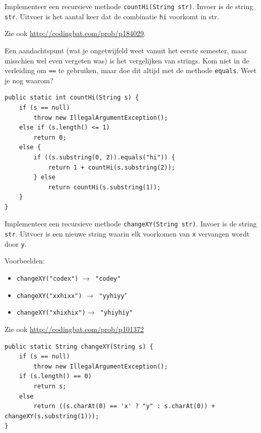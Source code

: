 \begin{oef}
\code Implementeer een recursieve methode \verb/countHi(String str)/. Invoer is de string \verb/str/. Uitvoer is het aantal keer dat de combinatie \verb/hi/ voorkomt in str.

Zie ook \url{http://codingbat.com/prob/p184029}.
\begin{opl}
Een aandachtspunt (wat je ongetwijfeld weet vanuit het eerste semester, maar misschien wel even vergeten was) is het vergelijken van strings. Kom niet in de verleiding om \verb+==+ te gebruiken, maar doe dit altijd met de methode \verb+equals+. Weet je nog waarom?
\begin{lstlisting}[caption={Recursieve methode om het aantal keer te tellen dat de string hi in een string voorkomt}, label=reccounthi]
public static int countHi(String s) {
	if (s == null)
		throw new IllegalArgumentException();
	else if (s.length() <= 1)
		return 0;
	else {
		if ((s.substring(0, 2)).equals("hi")) {
			return 1 + countHi(s.substring(2));
		} else
			return countHi(s.substring(1));
	}
}
\end{lstlisting}
\end{opl}
\end{oef}





\begin{oef}
\code Implementeer een recursieve methode \verb/changeXY(String str)/. Invoer is de string \verb/str/. Uitvoer is een nieuwe string waarin elk voorkomen van \verb/x/ vervangen wordt door \verb/y/.

Voorbeelden:
\begin{itemize}
\item \verb/changeXY("codex")/ $\rightarrow $\verb/ "codey"/
\item \verb/changeXY("xxhixx")/  $\rightarrow $\verb/ "yyhiyy/"
\item \verb/changeXY("xhixhix")/$ \rightarrow $\verb/ "yhiyhiy"/
\end{itemize}
Zie ook \url{http://codingbat.com/prob/p101372}

\begin{opl}
\begin{lstlisting}[caption={Vervang in een string elke letter x door een y}, label=recchangexy]
public static String changeXY(String s) {
	if (s == null)
		throw new IllegalArgumentException();
	if (s.length() == 0)
		return s;
	else
		return ((s.charAt(0) == 'x' ? "y" : s.charAt(0)) + changeXY(s.substring(1)));
}
\end{lstlisting}
\end{opl}
\end{oef}




